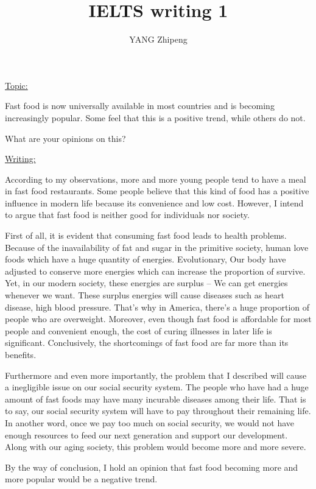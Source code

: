 \documentclass[UTF8]{ctexart}
\title{IELTS writing 1}
\author{YANG Zhipeng}
\date{}
\begin{document}
\maketitle
\thispagestyle{empty}
\LARGE{\underline{Topic:}}

Fast food is now universally available in most countries and is becoming increasingly popular. Some feel that this is a positive trend, while others do not.

What are your opinions on this?

\LARGE{\underline{Writing:}}

According to my observations, more and more young people tend to have a meal in fast food restaurants. Some people believe that this kind of food has a positive influence in modern life because its convenience and low cost. However, I intend to argue that fast food is neither good for individuals nor society.

First of all, it is evident that consuming fast food leads to health problems. Because of the inavailability of fat and sugar in the primitive society, human love foods which have a huge quantity of energies. Evolutionary, Our body have adjusted to conserve more energies which can increase the proportion of survive. Yet, in our modern society, these energies are surplus -- We can get energies whenever we want. These surplus energies will cause diseases such as heart disease, high blood pressure. That's why in America, there's a huge proportion of people who are overweight. Moreover, even though fast food is affordable for most people and convenient enough, the cost of curing illnesses in later life is significant. Conclusively, the shortcomings of fast food are far more than its benefits. 

Furthermore and even more importantly, the problem that I described will cause a inegligible issue on our social security system. The people who have had a huge amount of fast foods may have many incurable diseases among their life. That is to say, our social security system will have to pay throughout their remaining life. In another word, once we pay too much on social security, we would not have enough resources to feed our next generation and support our development. Along with our aging society, this problem would become more and more severe.

By the way of conclusion, I hold an opinion that fast food becoming more and more popular would be a negative trend.
\end{document}
